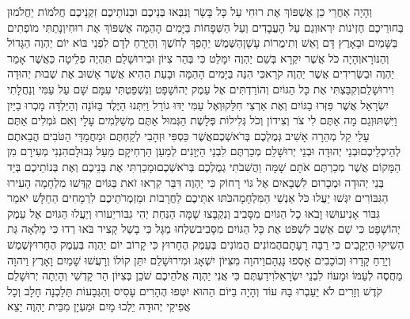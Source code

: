 \documentclass[../main/main.tex]{subfiles}
\begin{document}
\begin{multicols*}{\ncols}
וְהָיָה אַחֲרֵי כֵן אֶשְׁפּוֹךְ אֶת רוּחִי עַל כָּל בָּשָׂר וְנִבְּאוּ בְּנֵיכֶם וּבְנוֹתֵיכֶם זִקְנֵיכֶם חֲלֹמוֹת יַחֲלֹמוּן בַּחוּרֵיכֶם חֶזְיֹנוֹת יִרְאוּ\PreVerseSpace{}וְגַם עַל הָעֲבָדִים וְעַל הַשְּׁפָחוֹת בַּיָּמִים הָהֵמָּה אֶשְׁפּוֹךְ אֶת רוּחִי\PreVerseSpace{}וְנָתַתִּי מוֹפְתִים בַּשָּׁמַיִם וּבָאָרֶץ דָּם וָאֵשׁ וְתִימֲרוֹת עָשָׁן\PreVerseSpace{}הַשֶּׁמֶשׁ יֵהָפֵךְ לְחֹשֶׁךְ וְהַיָּרֵחַ לְדָם לִפְנֵי בּוֹא יוֹם יַהְוֶה הַגָּדוֹל וְהַנּוֹרָא\PreVerseSpace{}וְהָיָה כֹּל אֲשֶׁר יִקְרָא בְּשֵׁם יַהְוֶה יִמָּלֵט כִּי בְּהַר צִיּוֹן וּבִירוּשָׁלֵם תִּהְיֶה פְלֵיטָה כַּאֲשֶׁר אָמַר יַהְוֶה וּבַשְּׂרִידִים אֲשֶׁר יַהְוֶה קֹרֵא\PreChapterSpace{}כִּי הִנֵּה בַּיָּמִים הָהֵמָּה וּבָעֵת הַהִיא אֲשֶׁר אָשׁוּב אֶת שְׁבוּת יְהוּדָה וִירוּשָׁלֵם\PreVerseSpace{}וְקִבַּצְתִּי אֶת כָּל הַגּוֹיִם וְהוֹרַדְתִּים אֶל עֵמֶק יְהוֹשָׁפָט וְנִשְׁפַּטְתִּי עִמָּם שָׁם עַל עַמִּי וְנַחֲלָתִי יִשְׂרָאֵל אֲשֶׁר פִּזְּרוּ בַגּוֹיִם וְאֶת אַרְצִי חִלֵּקוּ\PreVerseSpace{}וְאֶל עַמִּי יַדּוּ גוֹרָל וַיִּתְּנוּ הַיֶּלֶד בַּזּוֹנָה וְהַיַּלְדָּה מָכְרוּ בַיַּיִן וַיִּשְׁתּוּ\PreVerseSpace{}וְגַם מָה אַתֶּם לִי צֹר וְצִידוֹן וְכֹל גְּלִילוֹת פְּלָשֶׁת הַגְּמוּל אַתֶּם מְשַׁלְּמִים עָלָי וְאִם גֹּמְלִים אַתֶּם עָלַי קַל מְהֵרָה אָשִׁיב גְּמֻלְכֶם בְּרֹאשְׁכֶם\PreVerseSpace{}אֲשֶׁר כַּסְפִּי וּזְהָבִי לְקַחְתֶּם וּמַחֲמַדַּי הַטֹּבִים הֲבֵאתֶם לְהֵיכְלֵיכֶם\PreVerseSpace{}וּבְנֵי יְהוּדָה וּבְנֵי יְרוּשָׁלֵם מְכַרְתֶּם לִבְנֵי הַיְּוָנִים לְמַעַן הַרְחִיקָם מֵעַל גְּבוּלָם\PreVerseSpace{}הִנְנִי מְעִירָם מִן הַמָּקוֹם אֲשֶׁר מְכַרְתֶּם אֹתָם שָׁמָּה וַהֲשִׁבֹתִי גְמֻלְכֶם בְּרֹאשְׁכֶם\PreVerseSpace{}וּמָכַרְתִּי אֶת בְּנֵיכֶם וְאֶת בְּנוֹתֵיכֶם בְּיַד בְּנֵי יְהוּדָה וּמְכָרוּם לִשְׁבָאיִם אֶל גּוֹי רָחוֹק כִּי יַהְוֶה דִּבֵּר \ClosedSection{}קִרְאוּ זֹאת בַּגּוֹיִם קַדְּשׁוּ מִלְחָמָה הָעִירוּ הַגִּבּוֹרִים יִגְּשׁוּ יַעֲלוּ כֹּל אַנְשֵׁי הַמִּלְחָמָה\PreVerseSpace{}כֹּתּוּ אִתֵּיכֶם לַחֲרָבוֹת וּמַזְמְרֹתֵיכֶם לִרְמָחִים הַחַלָּשׁ יֹאמַר גִּבּוֹר אָנִי\PreVerseSpace{}עוּשׁוּ וָבֹאוּ כָל הַגּוֹיִם מִסָּבִיב וְנִקְבָּצוּ שָׁמָּה הַנִּחַת יְהִי גִבּוֹר\SubEnd{}\PreVerseSpace{}יֵעוֹרוּ וְיַעֲלוּ הַגּוֹיִם אֶל עֵמֶק יְהוֹשָׁפָט כִּי שָׁם אֵשֵׁב לִשְׁפֹּט אֶת כָּל הַגּוֹיִם מִסָּבִיב\PreVerseSpace{}שִׁלְחוּ מַגָּל כִּי בָשַׁל קָצִיר בֹּאוּ רְדוּ כִּי מָלְאָה גַּת הֵשִׁיקוּ הַיְקָבִים כִּי רַבָּה רָעָתָם\PreVerseSpace{}הֲמוֹנִים הֲמוֹנִים בְּעֵמֶק הֶחָרוּץ כִּי קָרוֹב יוֹם יַהְוֶה בְּעֵמֶק הֶחָרוּץ\PreVerseSpace{}שֶׁמֶשׁ וְיָרֵחַ קָדָרוּ וְכוֹכָבִים אָסְפוּ נָגְהָם\PreVerseSpace{}וַיהוָה מִצִּיּוֹן יִשְׁאָג וּמִירוּשָׁלֵם יִתֵּן קוֹלוֹ וְרָעֲשׁוּ שָׁמַיִם וָאָרֶץ וַיהוָה מַחֲסֶה לְעַמּוֹ וּמָעוֹז לִבְנֵי יִשְׂרָאֵל\PreVerseSpace{}וִידַעְתֶּם כִּי אֲנִי יַהְוֶה אֱלֹהֵיכֶם שֹׁכֵן בְּצִיּוֹן הַר קָדְשִׁי וְהָיְתָה יְרוּשָׁלֵם קֹדֶשׁ וְזָרִים לֹא יַעַבְרוּ בָהּ עוֹד \ClosedSection{}וְהָיָה בַיּוֹם הַהוּא יִטְּפוּ הֶהָרִים עָסִיס וְהַגְּבָעוֹת תֵּלַכְנָה חָלָב וְכָל אֲפִיקֵי יְהוּדָה יֵלְכוּ מָיִם וּמַעְיָן מִבֵּית יַהְוֶה יֵצֵא 
\end{multicols*}
\end{document}
